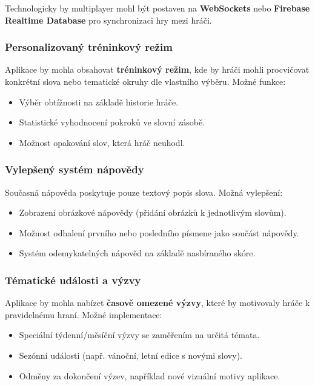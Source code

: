 \documentclass[a4paper,12pt]{article}
\begin{document}
Technologicky by multiplayer mohl být postaven na \textbf{WebSockets} nebo \textbf{Firebase Realtime Database} pro synchronizaci hry mezi hráči.

\subsubsection{Personalizovaný tréninkový režim}

Aplikace by mohla obsahovat \textbf{tréninkový režim}, kde by hráči mohli procvičovat konkrétní slova nebo tematické okruhy dle vlastního výběru. Možné funkce:
\begin{itemize}
    \item Výběr obtížnosti na základě historie hráče.
    \item Statistické vyhodnocení pokroků ve slovní zásobě.
    \item Možnost opakování slov, která hráč neuhodl.
\end{itemize}

\subsubsection{Vylepšený systém nápovědy}

Současná nápověda poskytuje pouze textový popis slova. Možná vylepšení:
\begin{itemize}
    \item Zobrazení obrázkové nápovědy (přidání obrázků k jednotlivým slovům).
    \item Možnost odhalení prvního nebo posledního písmene jako součást nápovědy.
    \item Systém odemykatelných nápověd na základě nasbíraného skóre.
\end{itemize}

\subsubsection{Tématické události a výzvy}

Aplikace by mohla nabízet \textbf{časově omezené výzvy}, které by motivovaly hráče k pravidelnému hraní. Možné implementace:
\begin{itemize}
    \item Speciální týdenní/měsíční výzvy se zaměřením na určitá témata.
    \item Sezónní události (např. vánoční, letní edice s novými slovy).
    \item Odměny za dokončení výzev, například nové vizuální motivy aplikace.
\end{itemize}
\end{document}
